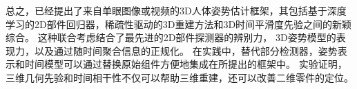 总之，已经提出了来自单眼图像或视频的3D人体姿势估计框架，其包括基于深度学习的2D部件回归器，稀疏性驱动的3D重建方法和3D时间平滑度先验之间的新颖综合。 这种联合考虑结合了最先进的2D部件探测器的辨别力，
3D姿势模型的表现力，以及通过随时间聚合信息的正规化。
在实践中，替代部分检测器，姿势表示和时间模型可以通过替换原始组件方便地集成在所提出的框架中。
实验证明，三维几何先验和时间相干性不仅可以帮助三维重建，还可以改善二维零件的定位。